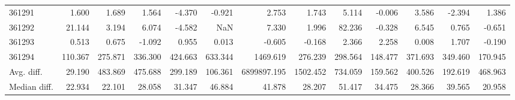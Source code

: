 \begin{tabular}{lrrrrrrrrrrrr}
361291 & 1.600 & 1.689 & 1.564 & -4.370 & -0.921 & 2.753 & 1.743 & 5.114 & -0.006 & 3.586 & -2.394 & 1.386 \\
361292 & 21.144 & 3.194 & 6.074 & -4.582 & NaN & 7.330 & 1.996 & 82.236 & -0.328 & 6.545 & 0.765 & -0.651 \\
361293 & 0.513 & 0.675 & -1.092 & 0.955 & 0.013 & -0.605 & -0.168 & 2.366 & 2.258 & 0.008 & 1.707 & -0.190 \\
361294 & 110.367 & 275.871 & 336.300 & 424.663 & 633.344 & 1469.619 & 276.239 & 298.564 & 148.477 & 371.693 & 349.460 & 170.945 \\
Avg. diff. & 29.190 & 483.869 & 475.688 & 299.189 & 106.361 & 6899897.195 & 1502.452 & 734.059 & 159.562 & 400.526 & 192.619 & 468.963 \\
Median diff. & 22.934 & 22.101 & 28.058 & 31.347 & 46.884 & 41.878 & 28.207 & 51.417 & 34.475 & 28.366 & 39.565 & 20.958 \\
\bottomrule
\end{tabular}
